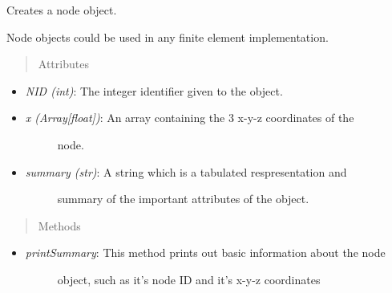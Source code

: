 \documentclass[letterpaper,10pt,english]{sphinxmanual}
\begin{document}
\begin{fulllineitems}
\label{structures:AeroComBAT.Structures.Node}
Creates a node object.

Node objects could be used in any finite element implementation.
\begin{quote}\begin{description}
\item[{Attributes}] \leavevmode
\end{description}\end{quote}
\begin{itemize}
\item {} 
\emph{NID (int)}: The integer identifier given to the object.

\item {} \begin{description}
\item[{\emph{x (Array{[}float{]})}: An array containing the 3 x-y-z coordinates of the}] \leavevmode
node.

\end{description}

\item {} \begin{description}
\item[{\emph{summary (str)}: A string which is a tabulated respresentation and}] \leavevmode
summary of the important attributes of the object.

\end{description}

\end{itemize}
\begin{quote}\begin{description}
\item[{Methods}] \leavevmode
\end{description}\end{quote}
\begin{itemize}
\item {} \begin{description}
\item[{\emph{printSummary}: This method prints out basic information about the node}] \leavevmode
object, such as it's node ID and it's x-y-z coordinates

\end{description}

\end{itemize}


\end{fulllineitems}
\end{document}
